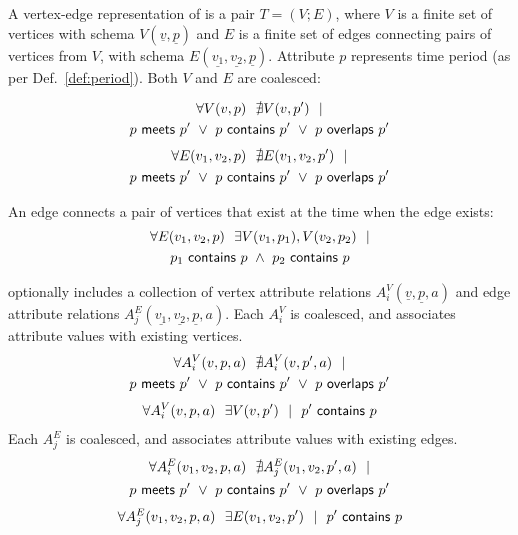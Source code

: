 \begin{definition}
A vertex-edge representation of \tg is a pair $T=(V; E)$, where $V$ is
a finite set of vertices with schema $V(\underline{v}, \underline{p})$
and $E$ is a finite set of edges connecting pairs of vertices from
$V$, with schema $E(\underline{v_1}, \underline{v_2}, \underline{p})$.
Attribute $p$ represents time period (as per Def.~\ref{def:period}).
Both $V$ and $E$ are coalesced:

\begin{multline}
\forall V(v, p)~~\nexists V(v, p')~~| \\
                       p~\mathsf{meets}~p'~\lor~p~\mathsf{contains}~p'~\lor~p~\mathsf{overlaps}~p'
\label{def:tg:c2}
\end{multline}
\vspace{-0.5cm}
\begin{multline}
\forall E(v_1, v_2, p)~~\nexists E(v_1,v_2, p')~~| \\
                       p~\mathsf{meets}~p'~\lor~p~\mathsf{contains}~p'~\lor~p~\mathsf{overlaps}~p'
\label{def:tg:c3}
\end{multline}

An edge connects a pair of vertices that exist at the time when the edge exists:
\begin{multline}
\forall E(v_1, v_2, p)~~\exists V(v_1, p_1), V(v_2, p_2)~~| \\
                       p_1~\mathsf{contains}~p~\wedge~p_2~\mathsf{contains}~p
\label{def:tg:c1}
\end{multline}
\vspace{-0.5cm}

 optionally includes a collection of vertex attribute
relations $A^{V}_i(\underline{v},\underline{p},a)$ and edge attribute
relations
$A^{E}_j(\underline{v_1},\underline{v_2},\underline{p},a)$. Each
$A^{V}_i$ is coalesced, and associates attribute values with existing
vertices.
\begin{multline}
\forall A^{V}_i(v, p, a)~~\nexists A^{V}_i(v, p', a)~~| \\
                       p~\mathsf{meets}~p'~\lor~p~\mathsf{contains}~p'~\lor~p~\mathsf{overlaps}~p'
\label{def:tg:c4}
\end{multline}
\begin{multline}
\forall A^{V}_i(v, p, a)~~\exists V(v,p')~~|~~p'~\mathsf{contains}~p
\label{def:tg:c5}
\end{multline}
Each $A^{E}_j$ is coalesced, and associates attribute values with
existing edges.
\begin{multline}
\forall A^{E}_i(v_1, v_2, p, a)~~\nexists A^{E}_j(v_1, v_2, p', a)~~| \\
                       p~\mathsf{meets}~p'~\lor~p~\mathsf{contains}~p'~\lor~p~\mathsf{overlaps}~p'
\label{def:tg:c6}
\end{multline}
\begin{multline}
\forall A^{E}_j(v_1, v_2, p, a)~~\exists E(v_1,v_2,p')~~|~~p'~\mathsf{contains}~p
\label{def:tg:c7}
\end{multline}

\label{def:tg}
\end{definition}

